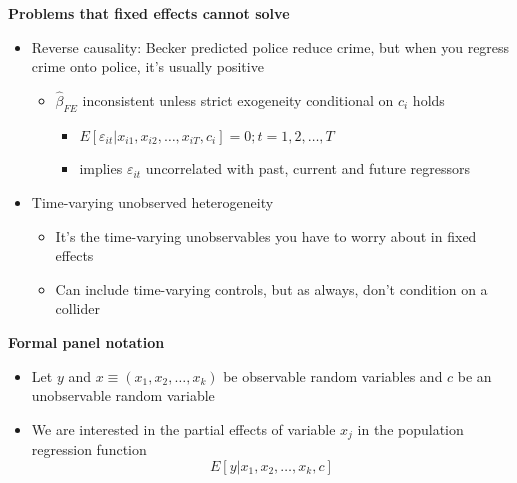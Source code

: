 \documentclass{beamer}
\begin{document}
\begin{frame}[plain]
	\begin{center}
	\textbf{Problems that fixed effects cannot solve}
	\end{center}
	
	\begin{itemize}
		\item Reverse causality: Becker predicted police reduce crime, but when you regress crime onto police, it's usually positive 
			\begin{itemize}
			\item $\widehat{\beta}_{FE}$ inconsistent unless strict exogeneity conditional on $c_i$ holds
				\begin{itemize}
				\item $E[\varepsilon_{it} | x_{i1},x_{i2},\dots,x_{iT},c_i]=0; t=1,2,\dots,T$
				\item implies $\varepsilon_{it}$ uncorrelated with past, current and future regressors
				\end{itemize}
			\end{itemize}
		\item Time-varying unobserved heterogeneity
			\begin{itemize}
			\item It's the time-varying unobservables you have to worry about in fixed effects
			\item Can include time-varying controls, but as always, don't condition on a collider
			\end{itemize}
	\end{itemize}
\end{frame}


\begin{frame}[plain]
	\begin{center}
	\textbf{Formal panel notation}
	\end{center}
	
	\begin{itemize}
	\item Let $y$ and $x\equiv(x_1, x_2, \dots, x_k)$ be observable random variables and $c$ be an unobservable random variable
	\item We are interested in the partial effects of variable $x_j$ in the population regression function$$E[y|x_1,x_2,\dots,x_k,c]$$
	\end{itemize}
\end{frame}
\end{document}
